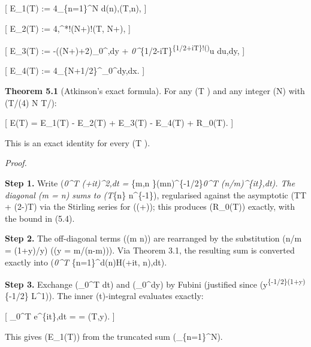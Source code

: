 \documentclass[
]{article}
\begin{document}
{[} E\_1(T) := 4\sum\_\{n=1\}\^{}N d(n),\Psi(T,n),  {]}

{[} E\_2(T) := 4,\Delta\^{}*!\left(N+\right)\Psi!\left(T,
N+\right),  {]}

{[} E\_3(T) :=
-(\log(N+)+2\gamma)\int\_0\^{}\infty {},dy
+
\int\emph{0\^{}\infty {}\int}\{1/2-iT\}\textsuperscript{\{1/2+iT\}!\left(\right)}u
du,dy,  {]}

{[} E\_4(T) :=
4\int\_\{N+1/2\}\^{}\infty {}\int\_0\^{}\infty {}dy,dx.
 {]}

\textbf{Theorem 5.1} (Atkinson's exact formula). For any (T ) and
any integer (N) with (T/(4\pi) \le N \le T/\pi):

{[} E(T) = E\_1(T) - E\_2(T) + E\_3(T) - E\_4(T) + R\_0(T). 
{]}

This is an exact identity for every (T ).

\emph{Proof.}

\textbf{Step 1.} Write (\int\emph{0\^{}T
\textbar{}\zeta(+it)\textbar\^{}2,dt = \sum}\{m,n
\}(mn)\^{}\{-1/2\}\int\emph{0\^{}T (n/m)\^{}\{it\},dt). The
diagonal (m = n) sums to (T\sum}\{n\} n\^{}\{-1\}), regularised against
the asymptotic (T\log T + (2-\pi)T) via the Stirling
series for (\log\Gamma(+)); this produces
(R\_0(T)) exactly, with the bound in (5.4).

\textbf{Step 2.} The off-diagonal terms ((m \ne n)) are rearranged by
the substitution (n/m = (1+y)/y) ((y = m/(n-m))). Via Theorem 3.1, the
resulting sum is converted exactly into (\int\emph{0\^{}T
\sum}\{n=1\}\^{}\infty d(n)H(+it, n),dt).

\textbf{Step 3.} Exchange (\int\_0\^{}T dt) and (\int\_0\^{}\infty dy)
by Fubini (justified since (y\textsuperscript{\{-1/2\}(1+y)}\{-1/2\}
\in L\^{}1)). The inner (t)-integral evaluates exactly:

{[} \int\_0\^{}T e\^{}\{it\log{}\},dt =
 =
\Phi(T,y). {]}

This gives (E\_1(T)) from the truncated sum (\sum\_\{n=1\}\^{}N).
\end{document}
